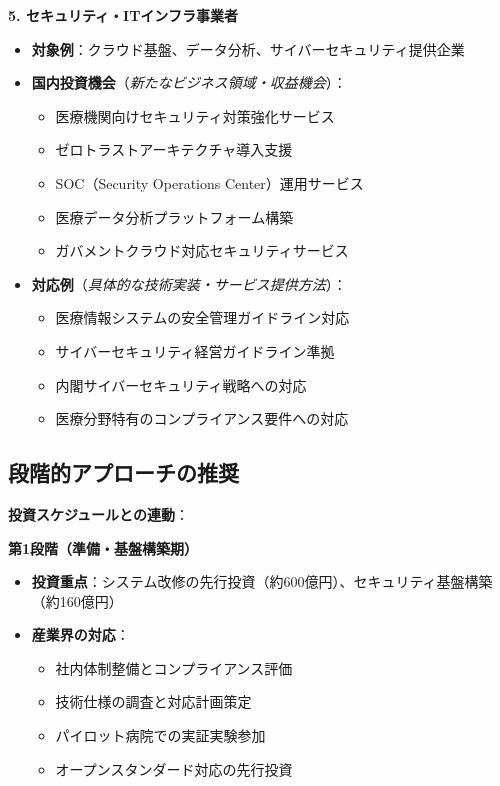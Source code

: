 \documentclass[
  a4paper,
  a4paper,
  11pt]{ltjsbook}
\providecommand{\tightlist}{%
  \setlength{\itemsep}{0pt}\setlength{\parskip}{0pt}}
\begin{document}
\textbf{5. セキュリティ・ITインフラ事業者}

\begin{itemize}
\item
  \textbf{対象例}：クラウド基盤、データ分析、サイバーセキュリティ提供企業
\item
  \textbf{国内投資機会}（\emph{新たなビジネス領域・収益機会}）：

  \begin{itemize}
  \tightlist
  \item
    医療機関向けセキュリティ対策強化サービス
  \item
    ゼロトラストアーキテクチャ導入支援
  \item
    SOC（Security Operations Center）運用サービス
  \item
    医療データ分析プラットフォーム構築
  \item
    ガバメントクラウド対応セキュリティサービス
  \end{itemize}
\item
  \textbf{対応例}（\emph{具体的な技術実装・サービス提供方法}）：

  \begin{itemize}
  \tightlist
  \item
    医療情報システムの安全管理ガイドライン対応
  \item
    サイバーセキュリティ経営ガイドライン準拠
  \item
    内閣サイバーセキュリティ戦略への対応
  \item
    医療分野特有のコンプライアンス要件への対応
  \end{itemize}
\end{itemize}

\subsection{段階的アプローチの推奨}\label{ux6bb5ux968eux7684ux30a2ux30d7ux30edux30fcux30c1ux306eux63a8ux5968}

\textbf{投資スケジュールとの連動}：

\textbf{第1段階（準備・基盤構築期）}

\begin{itemize}
\tightlist
\item
  \textbf{投資重点}：システム改修の先行投資（約600億円）、セキュリティ基盤構築（約160億円）
\item
  \textbf{産業界の対応}：

  \begin{itemize}
  \tightlist
  \item
    社内体制整備とコンプライアンス評価
  \item
    技術仕様の調査と対応計画策定
  \item
    パイロット病院での実証実験参加
  \item
    オープンスタンダード対応の先行投資
  \end{itemize}
\end{itemize}
\end{document}
